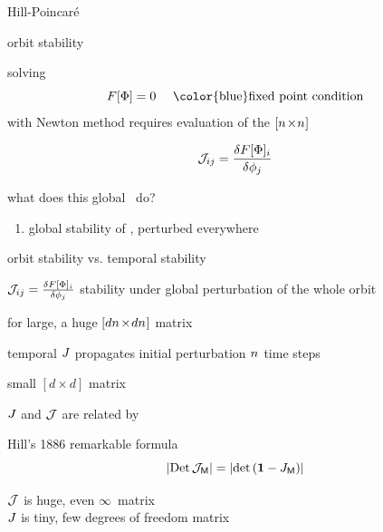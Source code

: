 \begin{frame}{Hill-Poincar\'e}
\vfill
\begin{center}
{\huge orbit stability}
\end{center}
\vfill
\end{frame} %

\begin{frame}{\jacobianOrb}
solving
\[
F[\Xx]=0 \quad \mbox{ \color{blue}fixed point condition}
\]
with Newton method requires evaluation of
the $[{n_{}}\!\times\!{n_{}}]$
    \begin{block}{\jacobianOrb}
\[
{\cal J}_{ij} =\frac{\delta F[\Phi]_i}{\delta \phi_j}
\] %
    \end{block}

what does this global \jacobianOrb\ do?
\bigskip

\begin{enumerate}
              \item
global stability of {\lattstate} \Xx, perturbed everywhere
            \end{enumerate}
\end{frame} %

\begin{frame}{orbit stability vs. temporal stability}
\begin{block}{\jacobianOrb}
\(
{\cal J}_{ij} =\frac{\delta F[\Phi]_i}{\delta \phi_j}
\)
stability under {\color{blue}global} perturbation of the whole orbit

\hfill for \cl{} large, a huge $[d{n_{}}\!\times\!d{n_{}}]$ matrix
\end{block}
\begin{block}{temporal {\jacobianM}}
\(
\jMps%
\)
propagates {\color{blue}initial} perturbation ${n_{}}$ time steps

\hfill small $[d\!\times\!d]$ matrix
\end{block}
\vfill

$J$ and ${\cal J}$ are related by
\begin{block}{Hill's 1886 remarkable formula}
\[
|\mbox{\rm Det}\,{\cal J}_{\mathsf{M}}| = |\mbox{\rm det}\,({\bf 1} - J_{\mathsf{M}})|
\]
\end{block}
${\cal J}$ is {\color{red}huge}, even $\infty$\dmn\ matrix\\
$J$ is {\color{red}tiny}, few degrees of freedom matrix
\end{frame} %

